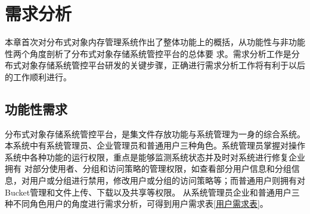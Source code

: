 \chapter{需求分析}

本章首次对分布式对象内存管理系统作出了整体功能上的概括，从功能性与非功能性两个角度剖析了分布式对象存储系统管控平台的总体要
求。需求分析工作是分布式对象存储系统管控平台研发的关键步骤，正确进行需求分析工作将有利于以后的工作顺利进行。

\section{功能性需求}

分布式对象存储系统管控平台，是集文件存放功能与系统管理为一身的综合系统。
本系统中有系统管理员、企业管理员和普通用户三种角色。系统管理员掌握对操作系统中各种功能的运行权限，重点是能够监测系统状态并及时对系统进行修复企业拥有
对部分使用者、分组和访问策略的管理权限，如查看部分用户信息和分组信息，对用户或分组进行禁用，修改用户或分组的访问策略等；而普通用户则拥有对Bucket管理和文件上传、下载以及共享等权限。
从系统管理员企业和普通用户三种不同角色用户的角度进行需求分析，可得到用户需求表\ref{用户需求表}。





